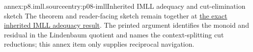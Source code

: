 \begin{annexitem}{annex:p8.imll.source}{entry:p08-imll}{Inherited IMLL adequacy and cut-elimination sketch}
The theorem and reader-facing sketch remain together at
\hyperref[thm:p08-source-imll-adequacy]{the exact inherited IMLL adequacy
result}.  The printed argument identifies the monoid and residual in the
Lindenbaum quotient and names the context-splitting cut reductions; this annex
item only supplies reciprocal navigation.
\end{annexitem}

